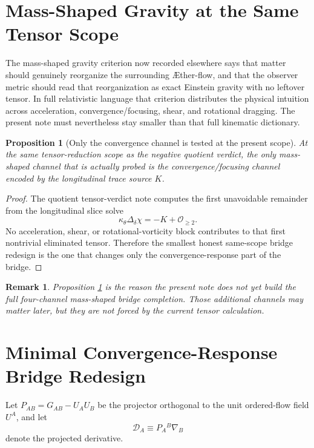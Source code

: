 \documentclass[11pt]{article}
\newcommand{\Aflow}{\AE{}ther-flow}
\newcommand{\Proj}{\mathcal D}
\newtheorem{proposition}{Proposition}
\newtheorem{remark}{Remark}
\begin{document}
\section{Mass-Shaped Gravity at the Same Tensor Scope}

The mass-shaped gravity criterion now recorded elsewhere says that matter should genuinely reorganize the surrounding \Aflow{}, and that the observer metric should read that reorganization as exact Einstein gravity with no leftover tensor. In full relativistic language that criterion distributes the physical intuition across acceleration, convergence/focusing, shear, and rotational dragging. The present note must nevertheless stay smaller than that full kinematic dictionary.

\begin{proposition}[Only the convergence channel is tested at the present scope]
\label{prop:onlyconv}
At the same tensor-reduction scope as the negative quotient verdict, the only mass-shaped channel that is actually probed is the convergence/focusing channel encoded by the longitudinal trace source \(K\).
\end{proposition}

\begin{proof}
The quotient tensor-verdict note computes the first unavoidable remainder from the longitudinal slice solve
\[
\kappa_\theta\Delta_\delta\chi=-K+\mathcal O_{\ge 2}.
\]
No acceleration, shear, or rotational-vorticity block contributes to that first nontrivial eliminated tensor. Therefore the smallest honest same-scope bridge redesign is the one that changes only the convergence-response part of the bridge.
\end{proof}

\begin{remark}
Proposition \ref{prop:onlyconv} is the reason the present note does not yet build the full four-channel mass-shaped bridge completion. Those additional channels may matter later, but they are not forced by the current tensor calculation.
\end{remark}

\section{Minimal Convergence-Response Bridge Redesign}

Let \(P_{AB}=G_{AB}-U_AU_B\) be the projector orthogonal to the unit ordered-flow field \(U^A\), and let
\[
\Proj_A \equiv P_A{}^B\nabla_B
\]
denote the projected derivative.
\end{document}
